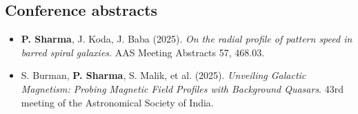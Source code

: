 \subsection*{Conference abstracts}
\begin{itemize}[leftmargin=0.15in, label={}, itemsep=2pt]
  \item \textbf{P. Sharma}, J. Koda, J. Baba (2025). \emph{On the radial profile of pattern speed in barred spiral galaxies}. AAS Meeting Abstracts 57, 468.03. 
  \item S. Burman, \textbf{P. Sharma}, S. Malik, et al. (2025). \emph{Unveiling Galactic Magnetism: Probing Magnetic Field Profiles with Background Quasars}. 43rd meeting of the Astronomical Society of India. 
\end{itemize}
